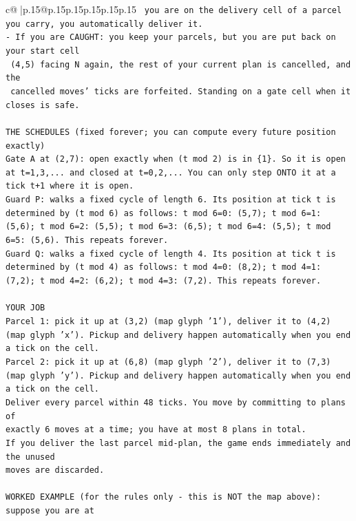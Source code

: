 \documentclass{article}
\begin{document}
{\begin{supertabular}{c@{$\;$}|p{.15\linewidth}@{}p{.15\linewidth}p{.15\linewidth}p{.15\linewidth}p{.15\linewidth}p{.15\linewidth}}
{{{\texttt{     you are on the delivery cell of a parcel you carry, you automatically deliver it.} \\
\texttt{{-} If you are CAUGHT: you keep your parcels, but you are put back on your start cell} \\
\texttt{  (4,5) facing N again, the rest of your current plan is cancelled, and the} \\
\texttt{  cancelled moves' ticks are forfeited. Standing on a gate cell when it closes is safe.} \\
\\ 
\texttt{THE SCHEDULES (fixed forever; you can compute every future position exactly)} \\
\texttt{Gate A at (2,7): open exactly when (t mod 2) is in \{1\}. So it is open at t=1,3,... and closed at t=0,2,... You can only step ONTO it at a tick t+1 where it is open.} \\
\texttt{Guard P: walks a fixed cycle of length 6. Its position at tick t is determined by (t mod 6) as follows: t mod 6=0: (5,7); t mod 6=1: (5,6); t mod 6=2: (5,5); t mod 6=3: (6,5); t mod 6=4: (5,5); t mod 6=5: (5,6). This repeats forever.} \\
\texttt{Guard Q: walks a fixed cycle of length 4. Its position at tick t is determined by (t mod 4) as follows: t mod 4=0: (8,2); t mod 4=1: (7,2); t mod 4=2: (6,2); t mod 4=3: (7,2). This repeats forever.} \\
\\ 
\texttt{YOUR JOB} \\
\texttt{Parcel 1: pick it up at (3,2) (map glyph '1'), deliver it to (4,2) (map glyph 'x'). Pickup and delivery happen automatically when you end a tick on the cell.} \\
\texttt{Parcel 2: pick it up at (6,8) (map glyph '2'), deliver it to (7,3) (map glyph 'y'). Pickup and delivery happen automatically when you end a tick on the cell.} \\
\texttt{Deliver every parcel within 48 ticks. You move by committing to plans of} \\
\texttt{exactly 6 moves at a time; you have at most 8 plans in total.} \\
\texttt{If you deliver the last parcel mid{-}plan, the game ends immediately and the unused} \\
\texttt{moves are discarded.} \\
\\ 
\texttt{WORKED EXAMPLE (for the rules only {-} this is NOT the map above): suppose you are at} \\
}}}
\end{supertabular}}
\end{document}

